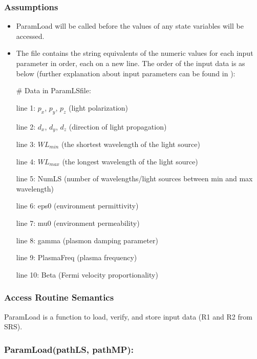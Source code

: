 \documentclass[12pt, titlepage]{article}
\begin{document}
	\subsubsection{Assumptions} \begin{itemize}
		
		\item ParamLoad will be called before the values of any state variables will
		be accessed.
		
		\item The file contains the string equivalents of the numeric values for each
		input parameter in order, each on a new line. The order of the input data is
		as below (further explanation about input parameters can be found in ):
		
		\# Data in ParamLSfile:
		
		line 1: $p_x$, $p_y$, $p_z$ (light polarization)
		
		line 2: $d_x$, $d_y$, $d_z$ (direction of light propagation)
		
		line 3: $WL_{min}$ (the shortest wavelength of the light source)
		
		line 4: $WL_{max}$ (the longest wavelength of the light source)
		
		line 5: NumLS (number of wavelengths/light sources between min and max
		wavelength)
		
		line 6: eps0 (environment permittivity)
		
		line 7: mu0 (environment permeability)
		
		line 8: gamma (plasmon damping parameter)
		
		line 9: PlasmaFreq (plasma frequency)
		
		line 10: Beta (Fermi velocity proportionality)
		
		
	\end{itemize}
	
	\subsubsection{Access Routine Semantics}
	
	ParamLoad is a function to load, verify, and store input data (R1 and R2 from
	SRS).
	
	\subsubsection*{ParamLoad(pathLS, pathMP):}
	
\end{document}
